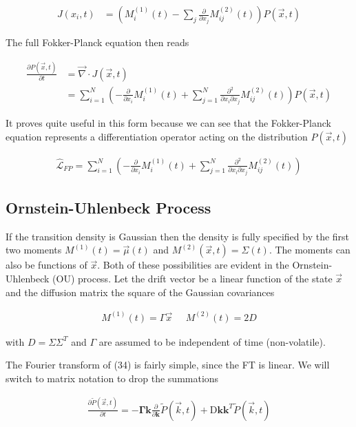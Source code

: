\documentclass{article}
\begin{document}
\begin{align}
J(x_{i},t)  &= \left(M_{i}^{(1)}(t) - \sum_{j}\frac{\partial}{\partial x_{j}}M_{ij}^{(2)}(t) \right)P(\vec{x},t)
\end{align}

The full Fokker-Planck equation then reads

\begin{align}
\frac{\partial P(\vec{x},t)}{\partial t}  &= \vec{\nabla} \cdot J(\vec{x},t)\\
&= \sum_{i=1}^{N}\left(-\frac{\partial}{\partial x_{i}}M_{i}^{(1)}(t) + \sum_{j=1}^{N} \frac{\partial^{2}}{\partial x_{i}\partial x_{j}}M_{ij}^{(2)}(t)\right)P(\vec{x},t)
\end{align}

It proves quite useful in this form because we can see that the Fokker-Planck equation represents a differentiation operator acting on the distribution $P(\vec{x},t)$

\begin{align}
\hat{\mathcal{L}}_{FP} = \sum_{i=1}^{N}\left(-\frac{\partial}{\partial x_{i}}M_{i}^{(1)}(t) + \sum_{j=1}^{N} \frac{\partial^{2}}{\partial x_{i}\partial x_{j}}M_{ij}^{(2)}(t)\right)
\end{align}

\subsection{Ornstein-Uhlenbeck Process}

If the transition density is Gaussian then the density is fully specified by the first two moments $M^{(1)}(t) = \vec{\mu}(t)$ and $M^{(2)}(\vec{x},t) = \Sigma(t)$. The moments can also be functions of $\vec{x}$. Both of these possibilities are evident in the Ornstein-Uhlenbeck (OU) process. Let the drift vector be a linear function of the state $\vec{x}$ and the diffusion matrix the square of the Gaussian covariances

\begin{align*}
M^{(1)}(t) = \Gamma \vec{x}\;\;\;\;\;M^{(2)}(t) = 2D
\end{align*}

with $D = \Sigma\Sigma^{T}$ and $\Gamma$ are assumed to be independent of time (non-volatile).


The Fourier transform of (34) is fairly simple, since the FT is linear. We will switch to matrix notation to drop the summations

\begin{align}
\frac{\partial \tilde{P}(\vec{x},t)}{\partial t}= -\bm{\Gamma}\bm{k}\frac{\partial}{\partial \bm{k}} \tilde{P}(\vec{k},t) + \bm{\mathrm{D}}\bm{k}\bm{k}^{T}\tilde{P}(\vec{k},t)
\end{align}
\end{document}
